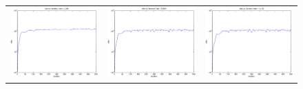 \documentclass{article} %
\begin{document}
\begin{figure}
\begin{tabular}{ccc}
\includegraphics[scale=0.3]{figures/func2-svi-lrate1e-03-bound.eps} &
\includegraphics[scale=0.3]{figures/func2-svi-lrate1e-04-bound.eps} &
\includegraphics[scale=0.3]{figures/func2-svi-lrate1e-05-bound.eps} \\ 

\end{tabular}
\end{figure}
\end{document}
